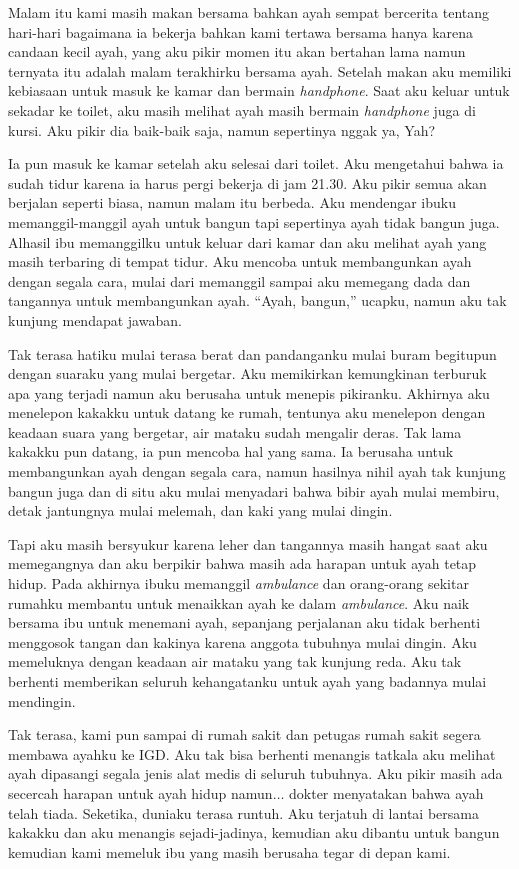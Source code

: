 Malam itu kami masih makan bersama bahkan ayah sempat bercerita tentang hari-hari bagaimana ia bekerja bahkan kami tertawa bersama hanya karena candaan kecil ayah, yang aku pikir momen itu akan bertahan lama namun ternyata itu adalah malam terakhirku bersama ayah. Setelah makan aku memiliki kebiasaan untuk masuk ke kamar dan bermain \textit{handphone}. Saat aku keluar untuk sekadar ke toilet, aku masih melihat ayah masih bermain \textit{handphone} juga di kursi. Aku pikir dia baik-baik saja, namun sepertinya nggak ya, Yah?

Ia pun masuk ke kamar setelah aku selesai dari toilet. Aku mengetahui bahwa ia sudah tidur karena ia harus pergi bekerja di jam 21.30. Aku pikir semua akan berjalan seperti biasa, namun malam itu berbeda. Aku mendengar ibuku memanggil-manggil ayah untuk bangun tapi sepertinya ayah tidak bangun juga. Alhasil ibu memanggilku untuk keluar dari kamar dan aku melihat ayah yang masih terbaring di tempat tidur. Aku mencoba untuk membangunkan ayah dengan segala cara, mulai dari memanggil sampai aku memegang dada dan tangannya untuk membangunkan ayah. ``Ayah, bangun,'' ucapku, namun aku tak kunjung mendapat jawaban.

Tak terasa hatiku mulai terasa berat dan pandanganku mulai buram begitupun dengan suaraku yang mulai bergetar. Aku memikirkan kemungkinan terburuk apa yang terjadi namun aku berusaha untuk menepis pikiranku. Akhirnya aku menelepon kakakku untuk datang ke rumah, tentunya aku menelepon dengan keadaan suara yang bergetar, air mataku sudah mengalir deras. Tak lama kakakku pun datang, ia pun mencoba hal yang sama. Ia berusaha untuk membangunkan ayah dengan segala cara, namun hasilnya nihil ayah tak kunjung bangun juga dan di situ aku mulai menyadari bahwa bibir ayah mulai membiru, detak jantungnya mulai melemah, dan kaki yang mulai dingin.

Tapi aku masih bersyukur karena leher dan tangannya masih hangat saat aku memegangnya dan aku berpikir bahwa masih ada harapan untuk ayah tetap hidup. Pada akhirnya ibuku memanggil \textit{ambulance} dan orang-orang sekitar rumahku membantu untuk menaikkan ayah ke dalam \textit{ambulance}. Aku naik bersama ibu untuk menemani ayah, sepanjang perjalanan aku tidak berhenti menggosok tangan dan kakinya karena anggota tubuhnya mulai dingin. Aku memeluknya dengan keadaan air mataku yang tak kunjung reda. Aku tak berhenti memberikan seluruh kehangatanku untuk ayah yang badannya mulai mendingin.

Tak terasa, kami pun sampai di rumah sakit dan petugas rumah sakit segera membawa ayahku ke IGD. Aku tak bisa berhenti menangis tatkala aku melihat ayah dipasangi segala jenis alat medis di seluruh tubuhnya. Aku pikir masih ada secercah harapan untuk ayah hidup namun$\dots$ dokter menyatakan bahwa ayah telah tiada. Seketika, duniaku terasa runtuh. Aku terjatuh di lantai bersama kakakku dan aku menangis sejadi-jadinya, kemudian aku dibantu untuk bangun kemudian kami memeluk ibu yang masih berusaha tegar di depan kami.

